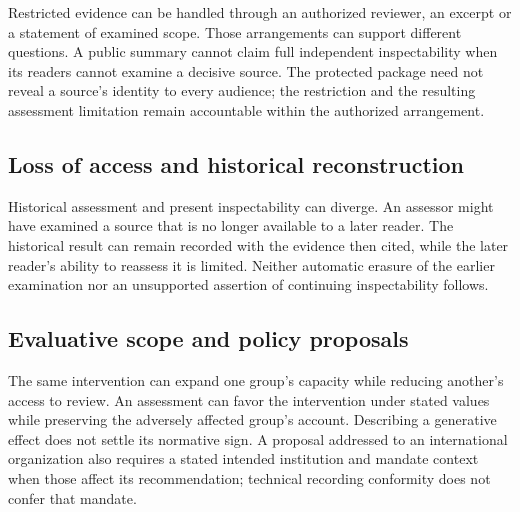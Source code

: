 \documentclass[11pt,a4paper]{article}
\begin{document}
Restricted evidence can be handled through an authorized reviewer, an excerpt or a statement of examined scope. Those arrangements can support different questions. A public summary cannot claim full independent inspectability when its readers cannot examine a decisive source. The protected package need not reveal a source's identity to every audience; the restriction and the resulting assessment limitation remain accountable within the authorized arrangement.

\subsection{Loss of access and historical reconstruction}

Historical assessment and present inspectability can diverge. An assessor might have examined a source that is no longer available to a later reader. The historical result can remain recorded with the evidence then cited, while the later reader's ability to reassess it is limited. Neither automatic erasure of the earlier examination nor an unsupported assertion of continuing inspectability follows.

\subsection{Evaluative scope and policy proposals}

The same intervention can expand one group's capacity while reducing another's access to review. An assessment can favor the intervention under stated values while preserving the adversely affected group's account. Describing a generative effect does not settle its normative sign. A proposal addressed to an international organization also requires a stated intended institution and mandate context when those affect its recommendation; technical recording conformity does not confer that mandate.
\end{document}
